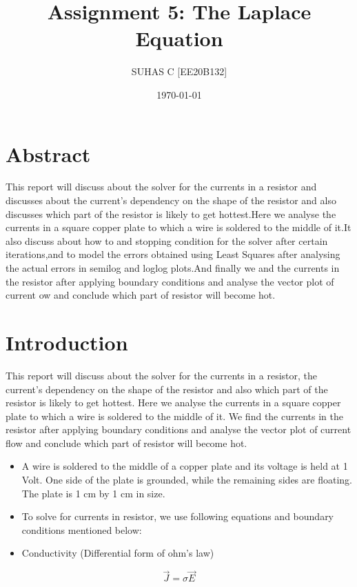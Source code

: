 \documentclass[11pt, a4paper]{article}
\title{Assignment 5: The Laplace Equation} %
\author{SUHAS C [EE20B132]} %
\date{\today} %
\begin{document}
	
\lstset{language=Python}
	
\maketitle %
  \section*{Abstract}
  This report will discuss about the solver for the currents in a resistor and discusses about the
current's dependency on the shape of the resistor and also discusses which part of the resistor is
likely to get hottest.Here we analyse the currents in a square copper plate to which a wire is soldered
to the middle of it.It also discuss about how to and stopping condition for the solver after certain
iterations,and to model the errors obtained using Least Squares after analysing the actual errors
in semilog and loglog plots.And finally we and the currents in the resistor after applying boundary
conditions and analyse the vector plot of current 
ow and conclude which part of resistor will become
hot. 	
  
  \section{Introduction}
  This report will discuss about the solver for the currents in a
resistor, the current's dependency on the shape of
the resistor and also which part of the resistor is likely to
get hottest. Here we analyse the currents in a square copper plate to
which a wire is soldered to the middle of it. We find the
currents in the resistor after applying boundary conditions and analyse
the vector plot of current flow and conclude which part of resistor will
become hot.

	\begin{itemize}
    \item
      A wire is soldered to the middle of a copper plate and its voltage is
      held at 1 Volt. One side of the plate is grounded, while the remaining 		  sides are floating. The plate is 1 cm by 1 cm in size.
    \item
      To solve for currents in resistor, we use following equations and
      boundary conditions mentioned below:
    \item
      Conductivity (Differential form of ohm's law)
    \end{itemize}
    
    \begin{equation}
    \vec{J} = \sigma\vec{E}
       \end{equation}
    
\end{document}
